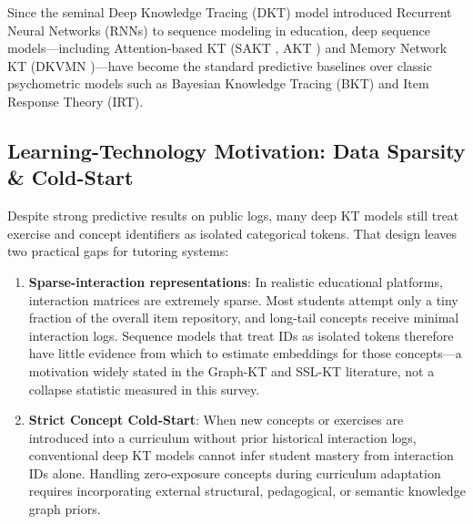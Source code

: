 \documentclass[lettersize,journal]{IEEEtran}
\begin{document}
Since the seminal Deep Knowledge Tracing (DKT) model \cite{Piech_DKT_2015} introduced Recurrent Neural Networks (RNNs) to sequence modeling in education, deep sequence models---including Attention-based KT (SAKT \cite{Pandey_SAKT_2019}, AKT \cite{Ghosh_AKT_2020}) and Memory Network KT (DKVMN \cite{Zhang_DKVMN_2017})---have become the standard predictive baselines over classic psychometric models such as Bayesian Knowledge Tracing (BKT) and Item Response Theory (IRT).

\subsection{Learning-Technology Motivation: Data Sparsity \& Cold-Start}
Despite strong predictive results on public logs, many deep KT models still treat exercise and concept identifiers as isolated categorical tokens. That design leaves two practical gaps for tutoring systems:
\begin{enumerate}
    \item \textbf{Sparse-interaction representations}: In realistic educational platforms, interaction matrices are extremely sparse. Most students attempt only a tiny fraction of the overall item repository, and long-tail concepts receive minimal interaction logs. Sequence models that treat IDs as isolated tokens therefore have little evidence from which to estimate embeddings for those concepts---a motivation widely stated in the Graph-KT and SSL-KT literature, not a collapse statistic measured in this survey.
    \item \textbf{Strict Concept Cold-Start}: When new concepts or exercises are introduced into a curriculum without prior historical interaction logs, conventional deep KT models cannot infer student mastery from interaction IDs alone. Handling zero-exposure concepts during curriculum adaptation requires incorporating external structural, pedagogical, or semantic knowledge graph priors.
\end{enumerate}
\end{document}
